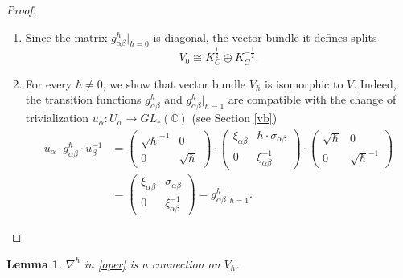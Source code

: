 \documentclass[oneside, 11pt]{amsart}
\newtheorem{lem}[thm]{Lemma}
\theoremstyle{definition}
\numberwithin{equation}{subsection}
\def\a{\alpha}
\def\b{\beta}
\begin{document}
\begin{proof}
\begin{enumerate}
\item Since the matrix $g_{\a\b}^{\hbar}|_{\hbar=0}$ is diagonal,  the vector bundle it defines splits $$V_0\cong K_C^{\frac{1}{2}}\oplus K_C^{-\frac{1}{2}}.$$

\item For every $\hbar\neq 0$, we show that
vector bundle $V_{\hbar}$ is isomorphic to $V$. 
Indeed, the transition functions $g_{\a\b}^{\hbar}$ and $g_{\a\b}^{\hbar}|_{\hbar=1}$ are compatible with the change of trivialization $u_{\a}:U_{\a}\stackrel{}{\rightarrow}GL_{r}(\mathbb{C})$ (see Section \ref{vb})
\begin{align}
\nonumber
u_{\a} \cdot g_{\a\b}^{\hbar}\cdot u_{\b}^{-1}& =\begin{pmatrix}
\sqrt{\hbar}^{-1} & 0\\ 0 & \sqrt{\hbar}
\end{pmatrix}\cdot
\begin{pmatrix}
\xi_{\a\b}&\hbar\cdot \sigma_{\a\b}\\ 0& \xi^{-1}_{\a\b}
\end{pmatrix}\cdot \begin{pmatrix}
\sqrt{\hbar} & 0\\ 0 & \sqrt{\hbar}^{-1}
\end{pmatrix}\\
&=\begin{pmatrix}
\xi_{\a\b}& \sigma_{\a\b}\\ 0& \xi^{-1}_{\a\b}
\end{pmatrix}=g_{\a\b}^{\hbar}|_{\hbar=1}.
\end{align}
\end{enumerate}
\end{proof}

\begin{lem}\label{gun2}
$\nabla^{\hbar}$ in \eqref{oper} is a connection on $V_{\hbar}$.
\end{lem}
\end{document}
